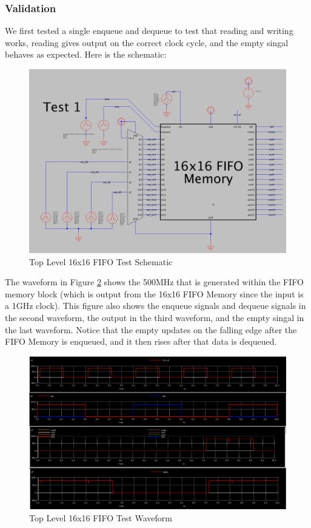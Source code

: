 \documentclass[a4paper]{article}
\begin{document}
\subsubsection{Validation}

We first tested a single enqueue and dequeue to test that reading and writing works, reading gives output on the correct clock cycle, and the empty singal behaves as expected. Here is the schematic:

\begin{figure}[H]
	\centering
	\includegraphics[scale=0.4]{topLevelTestSchematic}
	\caption{Top Level 16x16 FIFO Test Schematic}
	\label{fig:topLevelTestSchematic}
\end{figure}

The waveform in Figure \ref{fig:topLevelTestWaveform} shows the 500MHz that is generated within the FIFO memory block (which is output from the 16x16 FIFO Memory since the input is a 1GHz clock). This figure also shows the enqueue signals and dequeue signals in the second waveform, the output in the third waveform, and the empty singal in the last waveform. Notice that the empty updates on the falling edge after the FIFO Memory is enqueued, and it then rises after that data is dequeued.

\begin{figure}[H]
	\centering
	\includegraphics[scale=0.25]{topLevelTestWaveform}
	\caption{Top Level 16x16 FIFO Test Waveform}
	\label{fig:topLevelTestWaveform}
\end{figure}
\end{document}

